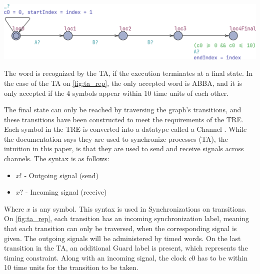 \vspace{0.75em}
\begin{center}
    \includegraphics[width=\columnwidth]{Documents/Diagrams/CheckingFigures/checking_tarep.png}
    \label{fig:ta_rep}
\end{center}
\vspace{0.75em}

The word is recognized by the TA, if the execution terminates at a final state.
In the case of the TA on \cref{fig:ta_rep}, the only accepted word is ABBA, and it is only accepted if the 4 symbols appear within 10 time units of each other.

\vspace{.5\baselineskip plus 2pt}
The final state can only be reached by traversing the graph's transitions, and these transitions have been constructed to meet the requirements of the TRE. Each symbol in the TRE is converted into a datatype called a Channel \cite{UPPAAL}. While the documentation says they are used to synchronize processes (TA), the intuition in this paper, is that they are used to send and receive signals across channels. The syntax is as follows:

\vspace{0.5em}
\begin{itemize}
    \setlength\itemsep{0.2em}
    \item $x!$ - Outgoing signal (send)
    \item $x?$ - Incoming signal (receive)
\end{itemize}
\vspace{0.5em}

Where $x$ is any symbol. This syntax is used in Synchronizations on transitions. On \cref{fig:ta_rep}, each transition has an incoming synchronization label, meaning that each transition can only be traversed, when the corresponding signal is given. The outgoing signals will be administered by timed words. On the last transition in the TA, an additional Guard label is present, which represents the timing constraint. Along with an incoming signal, the clock $c0$ has to be within 10 time units for the transition to be taken.

